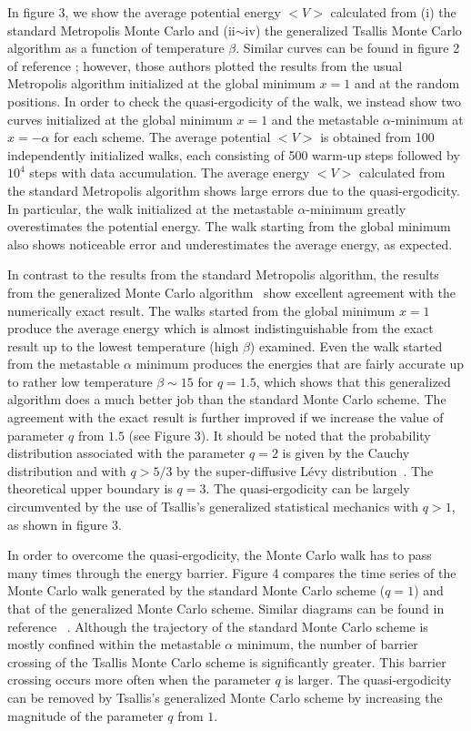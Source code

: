 In figure 3, we show the average potential energy $<V>$ calculated 
from (i) the standard Metropolis Monte Carlo and (ii$\sim$iv) the 
generalized Tsallis Monte Carlo algorithm as a function of
temperature $\beta$. Similar curves can be found in figure 2 of 
reference \cite{FFD}; however, those authors plotted the results 
from the usual Metropolis algorithm initialized at the global 
minimum $x=1$ and at the random positions. In order to check 
the quasi-ergodicity of the walk, we instead show two curves 
initialized at the global minimum $x=1$ and the metastable 
$\alpha$-minimum at $x=-\alpha$ for each scheme. The average 
potential $<V>$ is obtained from 100 independently initialized 
walks, each consisting of 500 warm-up steps followed by $10^{4}$ 
steps with data accumulation.  The average energy $<V>$ calculated 
from the standard Metropolis algorithm shows large errors due to 
the quasi-ergodicity. In particular, the walk initialized at 
the metastable $\alpha$-minimum greatly overestimates the potential 
energy. The walk starting from the global minimum also shows 
noticeable error and underestimates the average energy, as expected.


In contrast to the results from the standard Metropolis algorithm, 
the results from the generalized Monte Carlo algorithm~\cite{AS2,AS3} 
show excellent agreement with the numerically exact result. The 
walks started from the global minimum $x=1$ produce the average 
energy which is almost indistinguishable from the exact result up 
to the lowest temperature (high $\beta$) examined. Even the walk 
started from the metastable $\alpha$ minimum produces the energies 
that are fairly accurate up to rather low temperature $\beta \sim 15$ 
for $q=1.5$, which shows that this generalized algorithm does 
a much better job than the standard Monte Carlo scheme. The agreement 
with the exact result is further improved if we increase the value 
of parameter $q$ from $1.5$ (see Figure 3).  It should be noted 
that the probability distribution associated with the parameter 
$q=2$ is given by the Cauchy distribution and with $q>5/3$ by the 
super-diffusive L\'evy distribution~\cite{TS}. The theoretical upper 
boundary is $q=3$. The quasi-ergodicity can be largely circumvented 
by the use of Tsallis's generalized statistical mechanics with
$q>1$, as shown in figure 3. 

In order to overcome the quasi-ergodicity, the Monte Carlo
walk has to pass many times through the energy barrier.
Figure 4 compares the time series of the Monte Carlo walk
generated by the standard Monte Carlo scheme ($q=1$) and that 
of the generalized Monte Carlo scheme.  Similar diagrams
can be found in reference ~\cite{AS3}.  Although the 
trajectory of the standard Monte Carlo scheme is mostly 
confined within the metastable $\alpha$ minimum, the number 
of barrier crossing of the Tsallis Monte Carlo scheme is 
significantly greater.  This barrier crossing occurs more 
often when the parameter $q$ is larger.  The quasi-ergodicity 
can be removed by Tsallis's generalized Monte Carlo scheme 
by increasing the magnitude of the parameter $q$ from $1$.

